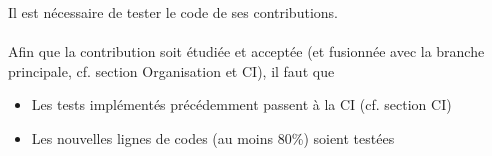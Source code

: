 Il est nécessaire de tester le code de ses contributions.
\\\\
Afin que la contribution soit étudiée et acceptée (et fusionnée avec la branche principale, cf. section Organisation et CI), il faut que
\begin{itemize}
	\item Les tests implémentés précédemment passent à la CI (cf. section CI)
	\item Les nouvelles lignes de codes (au moins 80\%) soient testées
\end{itemize}
